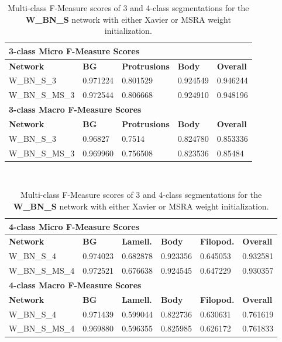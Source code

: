 \begin {table}
	\begin{flushleft}
		\begin {tabular}[!htb]{|l|l|l|l|l|}
			\hline\multicolumn{5}{|l|}{\textbf{3-class Micro F-Measure Scores}} \\ \hline
			\textbf{Network}& \textbf{BG}& \textbf{Protrusions}& \textbf{Body}& \textbf{Overall} \\ \hline
			W\_BN\_S\_3& 0.971224& 0.801529& 0.924549& 0.946244 \\ \hline
			W\_BN\_S\_MS\_3& \cellcolor{green!25}0.972544& \cellcolor{green!25}0.806668& \cellcolor{green!25}0.924910& \cellcolor{green!25}0.948196 \\ \hline
			\multicolumn{5}{|l|}{\textbf{3-class Macro F-Measure Scores}} \\ \hline
			\textbf{Network}& \textbf{BG}& \textbf{Protrusions}& \textbf{Body}& \textbf{Overall} \\ \hline
			W\_BN\_S\_3& 0.96827& 0.7514& \cellcolor{green!25}0.824780& 0.853336 \\ \hline
			W\_BN\_S\_MS\_3& \cellcolor{green!25}0.969960& \cellcolor{green!25}0.756508& 0.823536& \cellcolor{green!25}0.85484 \\ \hline
		\end {tabular}
		\vspace{0.5cm}\\
		\begin {tabular}[!htb]{|l|l|l|l|l|l|}
			\hline\multicolumn{6}{|l|}{\textbf{4-class Micro F-Measure Scores}} \\ \hline
			\textbf{Network}& \textbf{BG}& \textbf{Lamell.}& \textbf{Body}& \textbf{Filopod.}& \textbf{Overall} \\ \hline
			W\_BN\_S\_4& \cellcolor{green!25}0.974023& \cellcolor{green!25}0.682878& 0.923356& 0.645053& \cellcolor{green!25}0.932581 \\ \hline
			W\_BN\_S\_MS\_4& 0.972521& 0.676638& \cellcolor{green!25}0.924545& \cellcolor{green!25}0.647229& 0.930357 \\ \hline
			\multicolumn{6}{|l|}{\textbf{4-class Macro F-Measure Scores}} \\ \hline
			\textbf{Network}& \textbf{BG}& \textbf{Lamell.}& \textbf{Body}& \textbf{Filopod.}& \textbf{Overall} \\ \hline
			W\_BN\_S\_4& \cellcolor{green!25}0.971439& \cellcolor{green!25}0.599044& 0.822736& \cellcolor{green!25}0.630631& 0.761619 \\ \hline
			W\_BN\_S\_MS\_4& 0.969880& 0.596355& \cellcolor{green!25}0.825985& 0.626172& \cellcolor{green!25}0.761833 \\ \hline
		\end {tabular}
	\end {flushleft}
\caption[Multi-class F-Measure scores for networks with Xavier and MSRA weight initialization.]{Multi-class F-Measure scores of 3 and 4-class segmentations for the \textbf{W\_BN\_S} network with either Xavier or MSRA weight initialization.}
\label{tab:results4}
\end {table}

